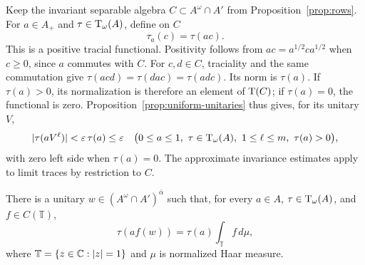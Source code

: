 Keep the invariant separable algebra \(C\subset A^\omega\cap A'\)
from Proposition~\ref{prop:rows}. For \(a\in A_+\) and
\(\tau\in\operatorname{T}_\omega(A)\), define on \(C\)
\begin{equation}\label{eq:weighted-trace}
 \tau_a(c)=\tau(ac).
\end{equation}
This is a positive tracial functional. Positivity follows from
\(ac=a^{1/2}ca^{1/2}\) when \(c\geq0\), since \(a\) commutes with \(C\).
For \(c,d\in C\), traciality and the same commutation give
\(\tau(acd)=\tau(dac)=\tau(adc)\). Its norm is \(\tau(a)\).
If \(\tau(a)>0\), its normalization is therefore an element of
\(\operatorname{T}(C)\); if \(\tau(a)=0\), the functional is zero.
Proposition~\ref{prop:uniform-unitaries} thus gives, for its unitary \(V\),
\begin{equation}\label{eq:weighted-small-moments}
 |\tau(aV^\ell)|<\varepsilon\,\tau(a)\leq\varepsilon
 \quad
 \bigl(0\leq a\leq1,\ \tau\in\operatorname{T}_\omega(A),\
       1\leq\ell\leq m,\ \tau(a)>0\bigr),
\end{equation}
with zero left side when \(\tau(a)=0\).
The approximate invariance estimates apply to limit traces by
restriction to \(C\).

\begin{proposition}\label{prop:haar}
There is a unitary \(w\in(A^\omega\cap A')^{\bar\alpha}\) such that,
for every \(a\in A\), \(\tau\in\operatorname{T}_\omega(A)\), and
\(f\in C(\mathbb T)\),
\begin{equation}\label{eq:haar}
 \tau(af(w))=\tau(a)\int_{\mathbb T}f\,d\mu,
\end{equation}
where \(\mathbb T=\{z\in\mathbb C:|z|=1\}\) and \(\mu\) is normalized
Haar measure.
\end{proposition}

